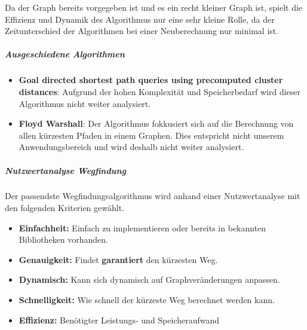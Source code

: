 Da der Graph bereits vorgegeben ist und es ein recht kleiner Graph ist, spielt die Effizienz und Dynamik des Algorithmus nur eine sehr kleine Rolle,
da der Zeitunterschied der Algorithmen bei einer Neuberechnung nur minimal ist.

\subparagraph{Ausgeschiedene Algorithmen}

\begin{itemize}
    \item \textbf{Goal directed shortest path queries using precomputed cluster distances}: Aufgrund der hohen Komplexität und Speicherbedarf wird dieser Algorithmus nicht weiter analysiert.
    \item \textbf{Floyd Warshall}: Der Algorithmus fokkusiert sich auf die Berechnung von allen kürzesten Pfaden in einem Graphen. Dies entspricht nicht unserem Anwendungsbereich und wird deshalb nicht weiter analysiert.
\end{itemize}

\subparagraph{Nutzwertanalyse Wegfindung}

Der passendste Wegfindungsalgorithmus wird anhand einer Nutzwertanalyse mit den folgenden Kriterien gewählt.

\begin{itemize}
    \item \textbf{Einfachheit:} Einfach zu implementieren oder bereits in bekannten Bibliotheken vorhanden.
    \item \textbf{Genauigkeit:} Findet \textbf{garantiert} den kürzesten Weg.
    \item \textbf{Dynamisch:} Kann sich dynamisch auf Graphveränderungen anpassen.
    \item \textbf{Schnelligkeit:} Wie schnell der kürzeste Weg berechnet werden kann.
    \item \textbf{Effizienz:} Benötigter Leistungs- und Speicheraufwand
\end{itemize}


